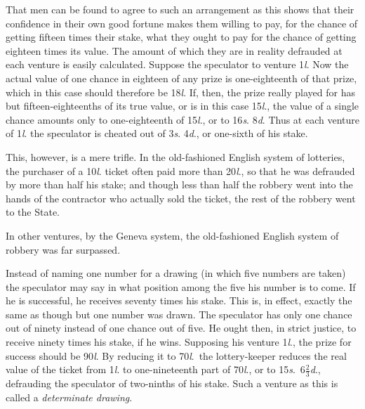 \documentclass[letterpaper,12pt,oneside,openany]{memoir}
\begin{document}
That men can be found to agree to such an arrangement
as this shows that their confidence in their own
good fortune makes them willing to pay, for the chance
of getting fifteen times their stake, what they ought to
pay for the chance of getting eighteen times its value.
The amount of which they are in reality defrauded at
each venture is easily calculated. Suppose the speculator
to venture 1\textit{l}. Now the actual value of one chance
in eighteen of any prize is one-eighteenth of that prize,
which in this case should therefore be 18\textit{l}. If, then,
the prize really played for has but fifteen-eighteenths
of its true value, or is in this case 15\textit{l}., the value of a
single chance amounts only to one-eighteenth of 15\textit{l}., or
to 16\textit{s}. 8\textit{d}. Thus at each venture of 1\textit{l}. the speculator
is cheated out of 3\textit{s}. 4\textit{d}., or one-sixth of his stake.

This, however, is a mere trifle. In the old-fashioned
English system of lotteries, the purchaser of a 10\textit{l}. ticket
often paid more than 20\textit{l}., so that he was defrauded by
more than half his stake; and though less than half the
robbery went into the hands of the contractor who
actually sold the ticket, the rest of the robbery went to
the State.

In other ventures, by the Geneva system, the
old-fashioned English system of robbery was far surpassed.

Instead of naming one number for a drawing (in
which five numbers are taken) the speculator may say
in what position among the five his number is to come.
If he is successful, he receives seventy times his stake.
This is, in effect, exactly the same as though but one
number was drawn. The speculator has only one
chance out of ninety instead of one chance out of five.
He ought then, in strict justice, to receive ninety times
his stake, if he wins. Supposing his venture 1\textit{l}., the
prize for success should be 90\textit{l}. By reducing it to 70\textit{l}.\ the
lottery-keeper reduces the real value of the ticket
from 1\textit{l}. to one-nineteenth part of 70\textit{l}., or
to 15\textit{s}.\ $6\frac{2}{3}$\textit{d}.,
defrauding the speculator of two-ninths of his stake.
Such a venture as this is called a \textit{determinate drawing}.
\end{document}
